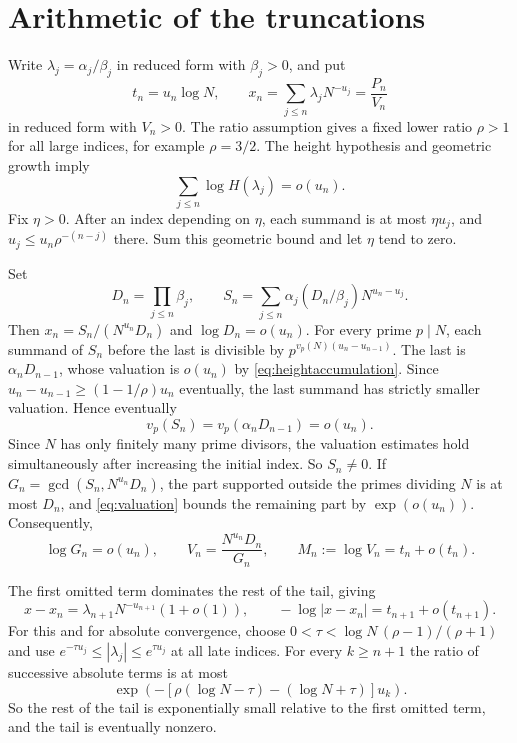 \documentclass{amsart}
\numberwithin{equation}{section}
\begin{document}
\section{Arithmetic of the truncations}\label{sec:arithmetic}

Write $\lambda_j=\alpha_j/\beta_j$ in reduced form with $\beta_j>0$,
and put
\begin{equation}\label{eq:truncations}
t_n=u_n\log N,\qquad
x_n=\sum_{j\le n}\lambda_jN^{-u_j}=\frac{P_n}{V_n}
\end{equation}
in reduced form with $V_n>0$. The ratio assumption gives a fixed lower
ratio $\rho>1$ for all large indices, for example $\rho=3/2$.
The height hypothesis and geometric growth imply
\begin{equation}\label{eq:heightaccumulation}
\sum_{j\le n}\log H(\lambda_j)=o(u_n).
\end{equation}
Fix $\eta>0$. After an index depending on $\eta$, each summand is at
most $\eta u_j$, and
$u_j\le u_n\rho^{-(n-j)}$ there. Sum this geometric bound
and let $\eta$ tend to zero.

Set
\[
D_n=\prod_{j\le n}\beta_j,\qquad
S_n=\sum_{j\le n}\alpha_j(D_n/\beta_j)N^{u_n-u_j}.
\]
Then $x_n=S_n/(N^{u_n}D_n)$ and $\log D_n=o(u_n)$.
For every prime $p\mid N$, each summand of $S_n$ before the last
is divisible by $p^{v_p(N)(u_n-u_{n-1})}$. The last is
$\alpha_nD_{n-1}$,
whose valuation is $o(u_n)$ by \eqref{eq:heightaccumulation}.
Since $u_n-u_{n-1}\ge(1-1/\rho)u_n$ eventually, the last summand
has strictly smaller valuation. Hence eventually
\begin{equation}\label{eq:valuation}
v_p(S_n)=v_p(\alpha_nD_{n-1})=o(u_n).
\end{equation}
Since $N$ has only finitely many prime divisors, the valuation estimates
hold simultaneously after increasing the initial index. So $S_n\ne0$.
If $G_n=\gcd(S_n,N^{u_n}D_n)$,
the part supported outside the primes dividing $N$ is at most $D_n$,
and \eqref{eq:valuation} bounds the remaining part by $\exp(o(u_n))$.
Consequently,
\begin{equation}\label{eq:reduceddenominator}
\log G_n=o(u_n),\qquad
V_n=\frac{N^{u_n}D_n}{G_n},\qquad
M_n:=\log V_n=t_n+o(t_n).
\end{equation}

The first omitted term dominates the rest of the tail, giving
\begin{equation}\label{eq:tail}
x-x_n=\lambda_{n+1}N^{-u_{n+1}}(1+o(1)),\qquad
-\log|x-x_n|=t_{n+1}+o(t_{n+1}).
\end{equation}
For this and for absolute convergence, choose
$0<\tau<\log N\,(\rho-1)/(\rho+1)$ and use
$e^{-\tau u_j}\le|\lambda_j|\le e^{\tau u_j}$ at all late
indices. For every $k\ge n+1$ the ratio of successive absolute terms
is at most
\[
\exp\!\left(-[\rho(\log N-\tau)-(\log N+\tau)]u_k\right).
\]
So the rest of the tail is exponentially small relative to the first
omitted term, and the tail is eventually nonzero.
\end{document}
